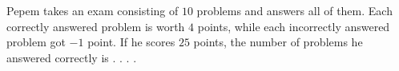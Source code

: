 Pepem takes an exam consisting of $10$ problems and answers all of them. Each correctly answered problem is worth $4$ points, while each incorrectly answered problem got $-1$ point. If he scores $25$ points, the number of problems he answered correctly is . . . .
